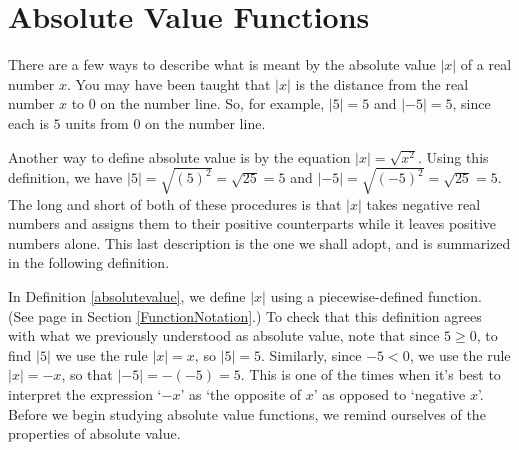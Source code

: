 \section{Absolute Value Functions}
\label{AbsoluteValueFunctions}

There are a few ways to describe what is meant by the absolute value $|x|$ of a real number $x$.  You may have been taught that $|x|$ is the distance from the real number $x$ to $0$ on the number line.  So, for example, $|5| = 5$ and $|-5| = 5$, since each is $5$ units from $0$ on the number line.

\begin{center}


\end{center}

Another way to define absolute value is by the equation $|x| = \sqrt{x^2}$. Using this definition, we have $|5| = \sqrt{(5)^2} = \sqrt{25} = 5$ and $|-5| = \sqrt{(-5)^2} = \sqrt{25} = 5$.  The long and short of both of these procedures is that $|x|$ takes negative real numbers and assigns them to their positive counterparts while it leaves positive numbers alone.  This last description is the one we shall adopt, and is summarized in the following definition.

\medskip


\medskip

In Definition \ref{absolutevalue}, we define $|x|$ using a piecewise-defined function.  (See page \pageref{piecewisefunction} in Section \ref{FunctionNotation}.)  To check that this definition agrees with what we previously understood as absolute value, note that since $5 \geq 0$, to find $|5|$ we use the rule $|x| = x$, so $|5|=5$.  Similarly, since $-5 < 0$, we use the rule $|x| = -x$, so that $|-5| = -(-5) = 5$.  This is one of the times when it's best to interpret the expression `$-x$' as `the opposite of $x$' as opposed to `negative $x$'.  Before we begin studying absolute value functions, we remind ourselves of the properties of absolute value.

